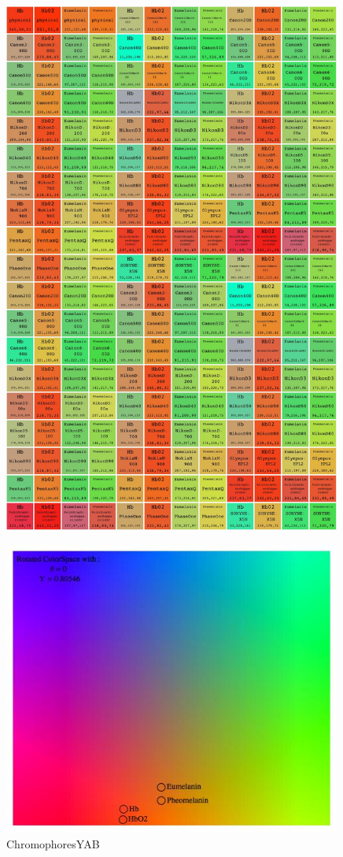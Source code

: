 \begin{figure}[h!]
  \centering
    \includegraphics[width=0.99\textwidth]{Chapter1/Figs/CameraComparison.jpg}
    \caption{ }  \label{fig:CameraComparison}
\end{figure}

\begin{figure}[h!]
  \centering
    \includegraphics[width=0.99\textwidth]{Chapter1/Figs/ChromophoresYAB.jpg}
    \caption{ChromophoresYAB }  \label{fig:ChromophoresYAB}
\end{figure}